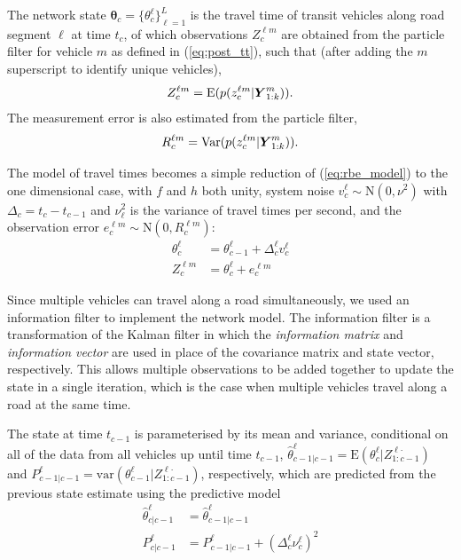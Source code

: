 The network state $\boldsymbol\theta_c = \{\theta_c^\ell\}_{\ell = 1}^L$ is the travel time 
of transit vehicles along road segment $\ell$ at time $t_c$,
of which observations $Z_c^{\ell m}$
are obtained from the particle filter for vehicle $m$ as defined in
(\ref{eq:post_tt}), such that 
(after adding the $m$ superscript to identify unique vehicles), 
\begin{equation*}
Z_c^{\ell m} = \mathrm{E}(p(z_c^{\ell m} | \mbox{$\boldsymbol{Y}$}^m_{1:k})).
\end{equation*}
The measurement error is also estimated from the particle filter,
\begin{equation*}
R_c^{\ell m} = \mathrm{Var}(p(z_c^{\ell m} | \mbox{$\boldsymbol{Y}$}^m_{1:k})).
\end{equation*}

The model of travel times becomes a simple reduction of (\ref{eq:rbe_model}) 
to the one dimensional case, 
with $f$ and $h$ both unity,
system noise $v_c^\ell \sim \mathrm{N}(0, \nu^2)$
with $\Delta_c = t_c - t_{c-1}$
and $\nu_\ell^2$ is the variance of travel times per second,
and the observation error $e_c^{\ell m} \sim \mathrm{N}(0, R_c^{\ell m})$:
\begin{equation*}
\begin{split}
\theta_c^\ell &= \theta_{c-1}^\ell + \Delta_c^\ell v_c^\ell \\
Z_c^{\ell m} &= \theta_c^\ell + e_c^{\ell m}
\end{split}
\end{equation*}


Since multiple vehicles can travel along a road simultaneously,
we used an information filter to implement the network model.
The information filter is a transformation of the Kalman filter in which the
\emph{information matrix} and \emph{information vector} are used in place of 
the covariance matrix and state vector, respectively.
This allows multiple observations to be added together to update the state
in a single iteration,
which is the case when multiple vehicles travel along a road at the same time.


The state at time $t_{c-1}$ is parameterised by its mean and variance,
conditional on all of the data from all vehicles up until time $t_{c-1}$,
$\hat \theta_{c-1|c-1}^\ell = \mathrm{E}(\theta_c^\ell | Z_{1:c-1}^{\ell\boldsymbol{\cdot}})$
and \mbox{$P_{c-1|c-1}^\ell = \mathrm{var}(\theta_{c-1}^\ell | Z_{1:c-1}^{\ell\boldsymbol{\cdot}})$}, respectively,
which are predicted from the previous state estimate using the predictive model
\begin{align*}
\label{eq:kf_transition}
\hat \theta^\ell_{c|c-1} &= \hat \theta^\ell_{c-1|c-1} \\
P^\ell_{c|c-1} &= P^\ell_{c-1|c-1} + (\Delta_c^\ell \nu_c^\ell)^2
\end{align*}

